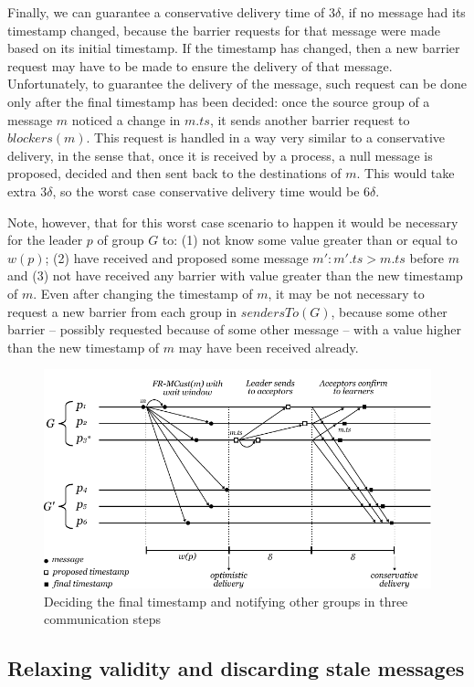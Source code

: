 \documentclass[times, 10pt]{article}
\begin{document}
Finally, we can guarantee a conservative delivery time of $3\delta$, if no message had its timestamp changed, because the barrier requests for that message were made based on its initial timestamp. If the timestamp has changed, then a new barrier request may have to be made to ensure the delivery of that message. Unfortunately, to guarantee the delivery of the message, such request can be done only after the final timestamp has been decided: once the source group of a message $m$ noticed a change in $m.ts$, it sends another barrier request to $blockers(m)$. This request is handled in a way very similar to a conservative delivery, in the sense that, once it is received by a process, a null message is proposed, decided and then sent back to the destinations of $m$. This would take extra $3\delta$, so the worst case conservative delivery time would be $6\delta$.

Note, however, that for this worst case scenario to happen it would be necessary for the leader $p$ of group $G$ to: (1) not know some value greater than or equal to $w(p)$; (2) have received and proposed some message $m' : m'.ts > m.ts$ before $m$ and (3) not have received any barrier with value greater than the new timestamp of $m$. Even after changing the timestamp of $m$, it may be not necessary to request a new barrier from each group in $sendersTo(G)$, because some other barrier -- possibly requested because of some other message -- with a value higher than the new timestamp of $m$ may have been received already.

\begin{figure}
  \centering
  \includegraphics[width=0.8\linewidth]{images/paxos3d}
  \caption{Deciding the final timestamp and notifying other groups in three communication steps}
  \label{fig:paxosmanylearnergroups}
\end{figure}



\subsection{Relaxing validity and discarding stale messages}
\end{document}
